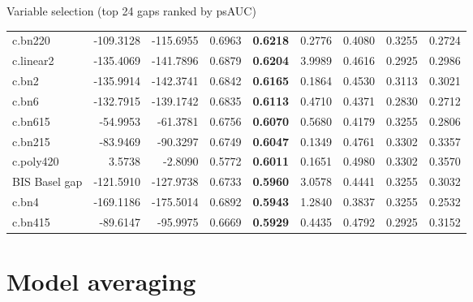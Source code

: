 \documentclass[
  ignorenonframetext,
]{beamer}
\begin{document}
\begin{frame}{Variable selection (top 24 gaps ranked by psAUC)}
{\begin{tabular}[t]{lrrr>{}rrrrr}
\addlinespace
c.bn220 & -109.3128 & -115.6955 & 0.6963 & \textbf{0.6218} & 0.2776 & 0.4080 & 0.3255 & 0.2724\\
c.linear2 & -135.4069 & -141.7896 & 0.6879 & \textbf{0.6204} & 3.9989 & 0.4616 & 0.2925 & 0.2986\\
c.bn2 & -135.9914 & -142.3741 & 0.6842 & \textbf{0.6165} & 0.1864 & 0.4530 & 0.3113 & 0.3021\\
c.bn6 & -132.7915 & -139.1742 & 0.6835 & \textbf{0.6113} & 0.4710 & 0.4371 & 0.2830 & 0.2712\\
c.bn615 & -54.9953 & -61.3781 & 0.6756 & \textbf{0.6070} & 0.5680 & 0.4179 & 0.3255 & 0.2806\\
\addlinespace
c.bn215 & -83.9469 & -90.3297 & 0.6749 & \textbf{0.6047} & 0.1349 & 0.4761 & 0.3302 & 0.3357\\
c.poly420 & 3.5738 & -2.8090 & 0.5772 & \textbf{0.6011} & 0.1651 & 0.4980 & 0.3302 & 0.3570\\
BIS Basel gap & -121.5910 & -127.9738 & 0.6733 & \textbf{0.5960} & 3.0578 & 0.4441 & 0.3255 & 0.3032\\
c.bn4 & -169.1186 & -175.5014 & 0.6892 & \textbf{0.5943} & 1.2840 & 0.3837 & 0.3255 & 0.2532\\
c.bn415 & -89.6147 & -95.9975 & 0.6669 & \textbf{0.5929} & 0.4435 & 0.4792 & 0.2925 & 0.3152\\
\bottomrule
\end{tabular}}
\end{frame}

\hypertarget{model-averaging}{%
\section{Model averaging}\label{model-averaging}}
\end{document}
